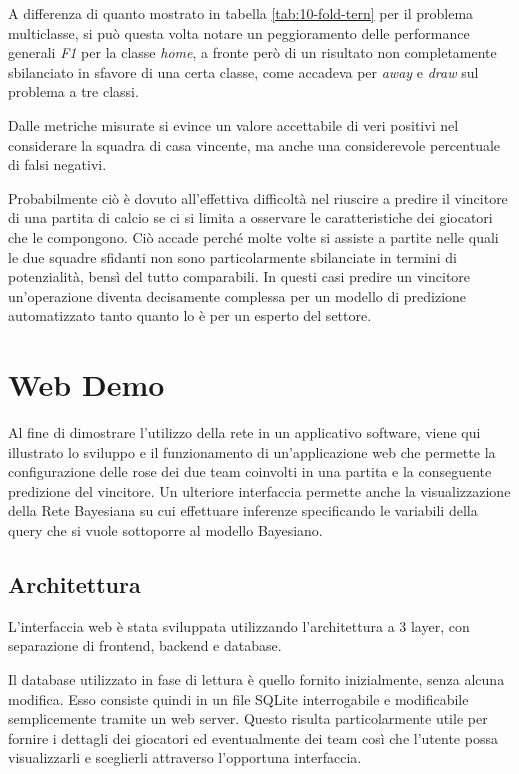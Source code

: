 \documentclass[hidelinks, 12pt]{article}
\begin{document}
A differenza di quanto mostrato in tabella \ref{tab:10-fold-tern} per il problema multiclasse, si può questa volta notare un peggioramento delle performance generali \textit{F1} per la classe \textit{home}, a fronte però di un risultato non completamente sbilanciato in sfavore di una certa classe, come accadeva per \textit{away} e \textit{draw} sul problema a tre classi.

Dalle metriche misurate si evince un valore accettabile di veri positivi nel considerare la squadra di casa vincente, ma anche una considerevole percentuale di falsi negativi.

Probabilmente ciò è dovuto all'effettiva difficoltà nel riuscire a predire il vincitore di una partita di calcio se ci si limita a osservare le caratteristiche dei giocatori che le compongono. Ciò accade perché molte volte si assiste a partite nelle quali le due squadre sfidanti non sono particolarmente sbilanciate in termini di potenzialità, bensì del tutto comparabili. In questi casi predire un vincitore un'operazione diventa decisamente complessa per un modello di predizione automatizzato tanto quanto lo è per un esperto del settore.



\clearpage



\section{Web Demo}
\label{sec:ui}

Al fine di dimostrare l'utilizzo della rete in un applicativo software, viene qui illustrato lo sviluppo e il funzionamento di un'applicazione web che permette la configurazione delle rose dei due team coinvolti in una partita e la conseguente predizione del vincitore. Un ulteriore interfaccia permette anche la visualizzazione della Rete Bayesiana su cui effettuare inferenze specificando le variabili della query che si vuole sottoporre al modello Bayesiano.



\subsection{Architettura}

L'interfaccia web è stata sviluppata utilizzando l'architettura a 3 layer, con separazione di frontend, backend e database.

Il database utilizzato in fase di lettura è quello fornito inizialmente, senza alcuna modifica. Esso consiste quindi in un file SQLite interrogabile e modificabile semplicemente tramite un web server. Questo risulta particolarmente utile per fornire i dettagli dei giocatori ed eventualmente dei team così che l'utente possa visualizzarli e sceglierli attraverso l'opportuna interfaccia.
\end{document}
